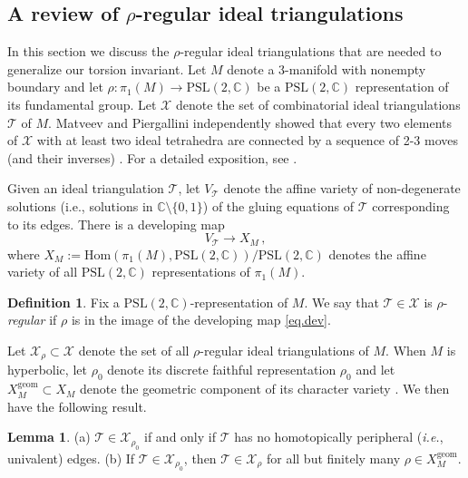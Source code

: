 \documentclass[12pt]{amsart}
\newcommand{\lbl}{\label}
\theoremstyle{definition}
\newtheorem{lemma}[theorem]{Lemma}
\newtheorem{definition}[theorem]{Definition}
\def\BC{\mathbb C}
\def\calT{\mathcal T}
\def\calX{\mathcal X}
\def\longto{\longrightarrow}
\def\PSL{\mathrm{PSL}}
\def\be{  \begin{equation} }
\def\ee{  \end{equation} }
\def\Hom{\mathrm{Hom}}
\def\geom{\mathrm{geom}}
\newcommand{\ie}{\emph{i.e.}}
\numberwithin{equation}{section}
\begin{document}
\subsection{A review of $\rho$-regular ideal triangulations}
\lbl{sub.revrho}

In this section we discuss the $\rho$-regular ideal triangulations
that are needed to generalize our torsion invariant. 
Let $M$ denote a 3-manifold with nonempty boundary and let
$\rho: \pi_1(M)\longto\PSL(2,\BC)$ be a $\PSL(2,\BC)$ representation of its
fundamental group. Let $\calX$ denote the set of combinatorial ideal
triangulations $\calT$ of $M$. 
Matveev and Piergallini independently
showed that every two elements of $\calX$ with at least two ideal
tetrahedra are connected by a sequence of 2-3 moves (and their inverses)
\cite{Ma1,Pi}. For a detailed exposition, see \cite{Ma2,BP}.

Given an ideal triangulation $\calT$, let $V_{\calT}$ denote the affine variety
of non-degenerate solutions (i.e., solutions in $\BC\setminus\{0,1\}$)
of the gluing equations of $\calT$ corresponding
to its edges. There is a developing map
\be
\lbl{eq.dev}
V_{\calT} \longto X_M\,,
\ee
where $X_M:=\Hom(\pi_1(M),\PSL(2,\BC))/\PSL(2,\BC)$ denotes the affine variety
of all $\PSL(2,\BC)$ representations of $\pi_1(M)$.


\begin{definition}
\lbl{def.rhoregular}
Fix a $\PSL(2,\BC)$-representation of $M$. We say that $\calT \in \calX$
is $\rho$-{\em regular} if $\rho$ is in the image of the developing map
\eqref{eq.dev}. 
\end{definition}
Let $\calX_\rho \subset \calX$ denote the set of all $\rho$-regular
ideal triangulations of $M$. When $M$ is hyperbolic, let
$\rho_0$ denote its discrete faithful 
representation $\rho_0$ and let $X^{\geom}_M \subset X_M$ denote the geometric 
component of its character variety \cite{Th,NZ}. We then have the following result.

\begin{lemma}
\lbl{lem.wellknown}
\rm{(a)} $\calT \in \calX_{\rho_0}$ if and only if 
$\calT$ has no homotopically peripheral (\ie, univalent) edges.
\newline
\rm{(b)} If $\calT \in \calX_{\rho_0}$, then 
$\calT \in \calX_{\rho}$ for all but finitely many $\rho \in X^{\geom}_M$.
\end{lemma}
\end{document}

